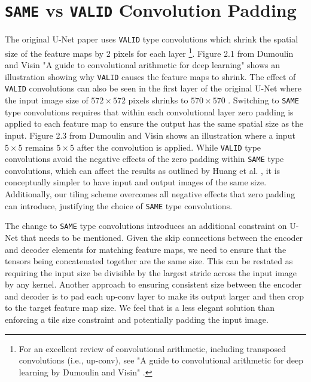 \documentclass[twoside,11pt]{article}
\begin{document}
\section{\texttt{SAME}  vs \texttt{VALID} Convolution Padding}

The original U-Net paper uses \texttt{VALID} type convolutions which shrink the spatial size of the feature maps by 2 pixels for each layer \cite{Dumoulin2018}\footnote{For an excellent review of convolutional arithmetic, including transposed convolutions (i.e., up-conv), see "A guide to convolutional arithmetic for deep learning by Dumoulin and Visin" \cite{Dumoulin2018}.}. 
Figure 2.1 from Dumoulin and Visin "A guide to convolutional arithmetic for deep learning" \cite{Dumoulin2018} shows an illustration showing why \texttt{VALID} causes the feature maps to shrink. The effect of \texttt{VALID} convolutions can also be seen in the first layer of the original U-Net where the input image size of $572 \times 572$ pixels shrinks to $570 \times 570$ \cite{Ronneberger2015a}. 
Switching to \texttt{SAME} type convolutions requires that within each convolutional layer zero padding is applied to each feature map to ensure the output has the same spatial size as the input. 
Figure 2.3 from Dumoulin and Visin \cite{Dumoulin2018} shows an illustration where a input $5 \times 5$ remains $5 \times 5$ after the convolution is applied. 
While \texttt{VALID} type convolutions avoid the negative effects of the zero padding within \texttt{SAME} type convolutions, which can affect the results as outlined by Huang et al. \cite{Huang2019a}, it is conceptually simpler to have input and output images of the same size. Additionally, our tiling scheme overcomes all negative effects that zero padding can introduce, justifying the choice of \texttt{SAME} type convolutions. 

The change to \texttt{SAME} type convolutions introduces an additional constraint on U-Net that needs to be mentioned. Given the skip connections between the encoder and decoder elements for matching feature maps, we need to ensure that the tensors being concatenated together are the same size. This can be restated as requiring the input size be divisible by the largest stride across the input image by any kernel. Another approach to ensuring consistent size between the encoder and decoder is to pad each up-conv layer to make its output larger and then crop to the target feature map size. We feel that is a less elegant solution than enforcing a tile size constraint and potentially padding the input image. 
\end{document}
